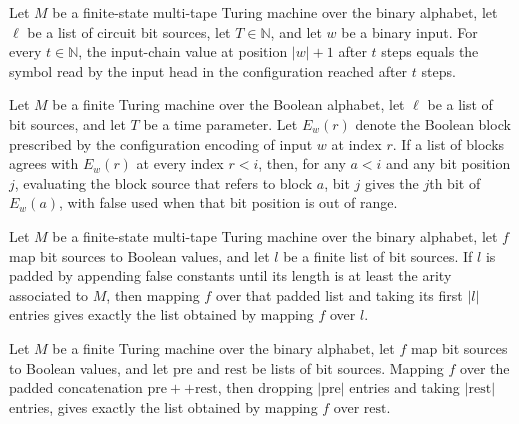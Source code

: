 \begin{theorem}
\label{Complexity.inpChain_right}
\leanok
{}
Let $M$ be a finite-state multi-tape Turing machine over the binary alphabet, let $\ell$
be a list of circuit bit sources, let $T\in\mathbb N$, and let $w$ be a binary input.
For every $t\in\mathbb N$, the input-chain value at position $|w|+1$ after $t$ steps
equals the symbol read by the input head in the configuration reached after $t$ steps.
\end{theorem}

\begin{theorem}
\label{Complexity.eval_block}
\leanok
{}
Let $M$ be a finite Turing machine over the Boolean alphabet, let $\ell$ be a list of
bit sources, and let $T$ be a time parameter. Let $E_w(r)$ denote the Boolean block
prescribed by the configuration encoding of input $w$ at index $r$. If a list of blocks
agrees with $E_w(r)$ at every index $r<i$, then, for any $a<i$ and any bit position $j$,
evaluating the block source that refers to block $a$, bit $j$ gives the $j$th bit of
$E_w(a)$, with false used when that bit position is out of range.
\end{theorem}

\begin{theorem}
\label{Complexity.padSrcs_map_take}
\leanok
{}
Let $M$ be a finite-state multi-tape Turing machine over the binary alphabet, let $f$
map bit sources to Boolean values, and let $l$ be a finite list of bit sources. If $l$
is padded by appending false constants until its length is at least the arity associated
to $M$, then mapping $f$ over that padded list and taking its first $|l|$ entries gives
exactly the list obtained by mapping $f$ over $l$.
\end{theorem}

\begin{theorem}
\label{Complexity.drop_take_padSrcs}
\leanok
{}
Let $M$ be a finite Turing machine over the binary alphabet, let $f$ map bit sources to
Boolean values, and let $\mathrm{pre}$ and $\mathrm{rest}$ be lists of bit sources.
Mapping $f$ over the padded concatenation $\mathrm{pre}++\mathrm{rest}$, then dropping
$|\mathrm{pre}|$ entries and taking $|\mathrm{rest}|$ entries, gives exactly the list
obtained by mapping $f$ over $\mathrm{rest}$.
\end{theorem}

